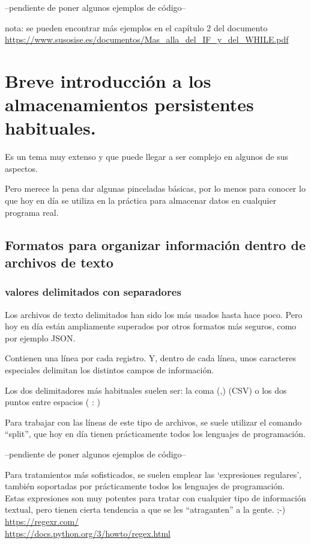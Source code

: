 \documentclass[spanish,12pt,a4paper,final,oneside]{book}
\begin{document}
\vspace{1cm}
--pendiente de poner algunos ejemplos de código--

\vspace{1cm}
nota: se pueden encontrar más ejemplos en el capítulo  2 del documento \url{https://www.susosise.es/documentos/Mas_alla_del_IF_y_del_WHILE.pdf}





\chapter{Breve introducción a los almacenamientos persistentes habituales.}
Es un tema muy extenso y que puede llegar a ser complejo en algunos de sus aspectos.

Pero merece la pena dar algunas pinceladas básicas, por lo menos para conocer lo que hoy en día se utiliza en la práctica para almacenar datos en cualquier programa real.

\section{Formatos para organizar información dentro de  archivos de texto}


\subsection{valores delimitados con separadores}
Los archivos de texto delimitados han sido los más usados hasta hace poco. Pero hoy en día están ampliamente superados por otros formatos más seguros, como por ejemplo JSON.

Contienen una línea por cada registro. Y, dentro de cada línea, unos caracteres especiales delimitan los distintos campos de información.

Los dos delimitadores más habituales suelen ser: la coma (,) (CSV)  o  los dos puntos entre espacios ( : )

Para trabajar con las líneas de este tipo de archivos, se suele utilizar el comando ``split'', que hoy en día tienen prácticamente todos los lenguajes de programación.

--pendiente de poner algunos ejemplos de código--

Para tratamientos más sofisticados, se suelen emplear las `expresiones regulares', también soportadas por prácticamente todos los lenguajes de programación.
\\Estas expresiones son muy potentes para tratar con cualquier tipo de información textual, pero tienen cierta tendencia a que se les ``atraganten'' a la gente.  ;-)
\\ \url{https://regexr.com/}
\\ \url{https://docs.python.org/3/howto/regex.html}
\end{document}
